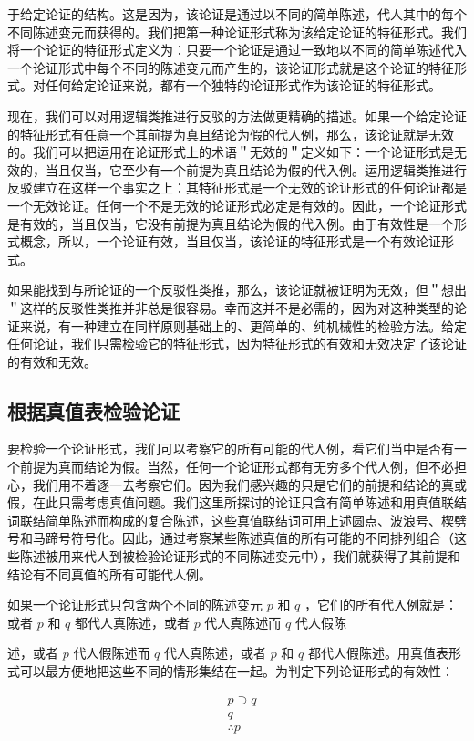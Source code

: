 于给定论证的结构。这是因为，该论证是通过以不同的简单陈述，代人其中的每个不同陈述变元而获得的。我们把第一种论证形式称为该给定论证的特征形式。我们将一个论证的特征形式定义为：只要一个论证是通过一致地以不同的简单陈述代入一个论证形式中每个不同的陈述变元而产生的，该论证形式就是这个论证的特征形式。对任何给定论证来说，都有一个独特的论证形式作为该论证的特征形式。

现在，我们可以对用逻辑类推进行反驳的方法做更精确的描述。如果一个给定论证的特征形式有任意一个其前提为真且结论为假的代人例，那么，该论证就是无效的。我们可以把运用在论证形式上的术语＂无效的＂定义如下：一个论证形式是无效的，当且仅当，它至少有一个前提为真且结论为假的代入例。运用逻辑类推进行反驳建立在这样一个事实之上：其特征形式是一个无效的论证形式的任何论证都是一个无效论证。任何一个不是无效的论证形式必定是有效的。因此，一个论证形式是有效的，当且仅当，它没有前提为真且结论为假的代入例。由于有效性是一个形式概念，所以，一个论证有效，当且仅当，该论证的特征形式是一个有效论证形式。

如果能找到与所论证的一个反驳性类推，那么，该论证就被证明为无效，但＂想出＂这样的反驳性类推并非总是很容易。幸而这并不是必需的，因为对这种类型的论证来说，有一种建立在同样原则基础上的、更简单的、纯机械性的检验方法。给定任何论证，我们只需检验它的特征形式，因为特征形式的有效和无效决定了该论证的有效和无效。

\subsection{根据真值表检验论证}
要检验一个论证形式，我们可以考察它的所有可能的代人例，看它们当中是否有一个前提为真而结论为假。当然，任何一个论证形式都有无穷多个代人例，但不必担心，我们用不着逐一去考察它们。因为我们感兴趣的只是它们的前提和结论的真或假，在此只需考虑真值问题。我们这里所探讨的论证只含有简单陈述和用真值联结词联结简单陈述而构成的复合陈述，这些真值联结词可用上述圆点、波浪号、楔劈号和马蹄号符号化。因此，通过考察某些陈述真值的所有可能的不同排列组合（这些陈述被用来代人到被检验论证形式的不同陈述变元中），我们就获得了其前提和结论有不同真值的所有可能代人例。

如果一个论证形式只包含两个不同的陈述变元 $p$ 和 $q$ ，它们的所有代入例就是：或者 $p$ 和 $q$ 都代人真陈述，或者 $p$ 代人真陈述而 $q$ 代人假陈

述，或者 $p$ 代人假陈述而 $q$ 代人真陈述，或者 $p$ 和 $q$ 都代人假陈述。用真值表形式可以最方便地把这些不同的情形集结在一起。为判定下列论证形式的有效性：

$$
\begin{aligned}
& p \supset q \\
& q \\
& \therefore p
\end{aligned}
$$

